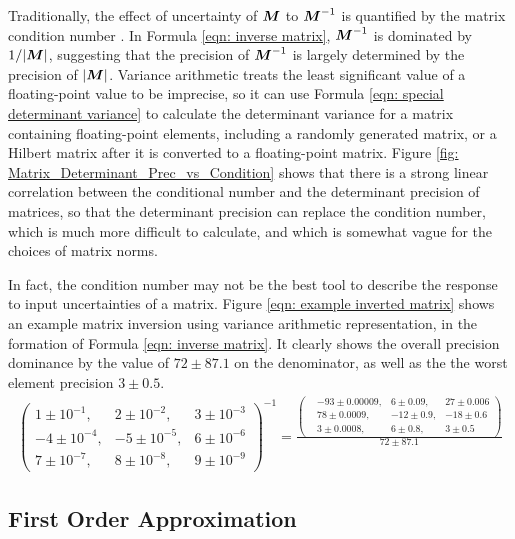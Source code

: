 \documentclass[twoside]{article}
\numberwithin{equation}{section}
\begin{document}
Traditionally, the effect of uncertainty of  $\protect{\textrm{\boldmath $M$}}$ to $\protect{\textrm{\boldmath $M$}}^{-1}$ is quantified by the matrix condition number \cite{Linear_Algebra}.
In Formula \eqref{eqn: inverse matrix}, $\protect{\textrm{\boldmath $M$}}^{-1}$ is dominated by $1/|\protect{\textrm{\boldmath $M$}}|$, suggesting that the precision of $\protect{\textrm{\boldmath $M$}}^{-1}$ is largely determined by the precision of $|\protect{\textrm{\boldmath $M$}}|$.
Variance arithmetic treats the least significant value of a floating-point value to be imprecise, so it can use Formula \eqref{eqn: special determinant variance} to calculate the determinant variance for a matrix containing floating-point elements, including a randomly generated matrix, or a Hilbert matrix \cite{Linear_Algebra} after it is converted to a floating-point matrix.
Figure \ref{fig: Matrix_Determinant_Prec_vs_Condition} shows that there is a strong linear correlation between the conditional number and the determinant precision of matrices, so that the determinant precision can replace the condition number, which is much more difficult to calculate, and which is somewhat vague for the choices of matrix norms.

In fact, the condition number may not be the best tool to describe the response to input uncertainties of a matrix.
Figure \eqref{eqn: example inverted matrix} shows an example matrix inversion using variance arithmetic representation, in the formation of Formula \eqref{eqn: inverse matrix}.
It clearly shows the overall precision dominance by the value of $72 \pm 87.1$ on the denominator, as well as the the worst element precision $3 \pm 0.5$.
\begin{align}
\label{eqn: example inverted matrix}
\left( \begin{matrix}
	 1 \pm 10^{-1},  &2 \pm 10^{-2},  &3 \pm 10^{-3} \\
	-4 \pm 10^{-4}, &-5 \pm 10^{-5},  &6 \pm 10^{-6} \\
	 7 \pm 10^{-7},  &8 \pm 10^{-8},  &9 \pm 10^{-9}
\end{matrix} \right)^{-1} = \frac{ \left( \begin{matrix}
	&-93 \pm 0.00009,  &6 \pm 0.09,  &27 \pm 0.006 \\
	&78 \pm 0.0009, &-12 \pm 0.9,  &-18 \pm 0.6 \\
	&3 \pm 0.0008,  &6 \pm 0.8,  &3 \pm 0.5
\end{matrix} \right) }{72 \pm 87.1}
\end{align}



\subsection{First Order Approximation}
\end{document}
